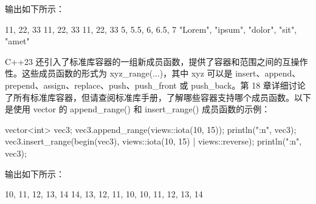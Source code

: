 输出如下所示：

\begin{shell}
11, 22, 33
11, 22, 33
11, 22, 33
5, 5.5, 6, 6.5, 7
"Lorem", "ipsum", "dolor", "sit", "amet"
\end{shell}

C++23 还引入了标准库容器的一组新成员函数，提供了容器和范围之间的互操作性。这些成员函数的形式为 xyz\_range(...)，其中 xyz 可以是 insert、append、prepend、assign、replace、push、push\_front 或 push\_back。第 18 章详细讨论了所有标准库容器，但请查阅标准库手册，了解哪些容器支持哪个成员函数。以下是使用 vector 的 append\_range() 和 insert\_range() 成员函数的示例：

\begin{cpp}
vector<int> vec3;
vec3.append_range(views::iota(10, 15));
println("{:n}", vec3);
vec3.insert_range(begin(vec3), views::iota(10, 15) | views::reverse);
println("{:n}", vec3);
\end{cpp}

输出如下所示：

\begin{shell}
10, 11, 12, 13, 14
14, 13, 12, 11, 10, 10, 11, 12, 13, 14
\end{shell}








